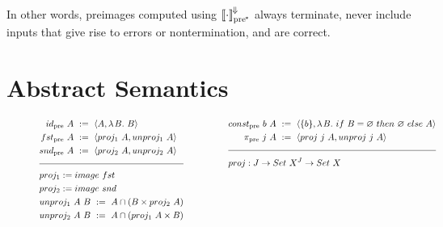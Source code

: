 \documentclass{llncs}
\newcommand{\smallmathfont}{\fontsize{7.5}{9}\selectfont}
\newcommand{\conv}{^{\mspace{-2mu}\Downarrow\mspace{-2mu}}}
\newcommand{\meaningofconv}[1]{\left\llbracket{#1}\right\rrbracket\conv}
\newcommand{\pre}{_\mathrm{pre}}
\newcommand{\ppre}{_\mathrm{pre^{\mspace{-2mu}*}}}
\begin{document}
In other words, preimages computed using $\meaningofconv{\cdot}\ppre$ always terminate, never include inputs that give rise to errors or nontermination, and are correct.


\section{Abstract Semantics}
\label{sec:abstract-semantics}

\begin{figure}[!tb]\centering
\smallmathfont
\begin{align*}
\begin{aligned}[t]
	&\begin{aligned}[t]
		id\pre~A &\ := \ \pair{A,\fun{B}{B}} \\
		fst\pre~A &\ := \ \pair{proj_1~A,unproj_1~A} \\
		snd\pre~A &\ := \ \pair{proj_2~A,unproj_2~A} \\
	\end{aligned} \\
\\[-8pt]
\hline
\\[-8pt]
	&\begin{aligned}[t]
		&proj_1 := image~fst \\
		&proj_2 := image~snd \\
		&unproj_1~A~B \ := \ A \i (B \times proj_2~A) \\
		&unproj_2~A~B \ := \ A \i (proj_1~A \times B)
	\end{aligned}
\end{aligned}
&\tab\tab\tab\tab\tab
\begin{aligned}[t]
	&\begin{aligned}[t]
		const\pre~b~A &\ := \ \pair{\set{b},\fun{B}{if~B = \emptyset~then~\emptyset~else~A}} \\
		\pi\pre~j~A &\ := \ \pair{proj~j~A, unproj~j~A}
	\end{aligned} \\
\\[-8pt]
\hline
\\[-8pt]
	&\begin{aligned}[t]
		&proj : J \to Set~X^J \to Set~X \\

\end{aligned}
\end{aligned}
\end{align*}
\end{figure}
\end{document}
